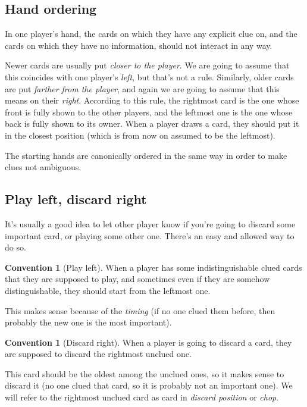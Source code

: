 \documentclass[a4paper]{article}
\theoremstyle{plain}
\theoremstyle{definition}
\newtheorem{convention}[theorem]{Convention}
\begin{document}
\subsection{Hand ordering}

In one player's hand, the cards on which they have any explicit clue on, and the cards on which they have no information, should not interact in any way.

Newer cards are usually put \textit{closer to the player}. We are going to assume that this coincides with one player's \textit{left}, but that's not a rule. Similarly, older cards are put \textit{farther from the player}, and again we are going to assume that this means on their \textit{right}. According to this rule, the rightmost card is the one whose front is fully shown to the other players, and the leftmost one is the one whose back is fully shown to its owner. When a player draws a card, they should put it in the closest position (which is from now on assumed to be the leftmost).

The starting hands are canonically ordered in the same way in order to make clues not ambiguous.

\subsection{Play left, discard right}

It's usually a good idea to let other player know if you're going to discard some important card, or playing some other one. There's an easy and allowed way to do so.

\begin{convention}[Play left]
	\label{play-left}
	When a player has some indistinguishable clued cards that they are supposed to play, and sometimes even if they are somehow distinguishable, they should start from the leftmost one.
\end{convention}

This makes sense because of the \textit{timing} (if no one clued them before, then probably the new one is the most important).

\begin{convention}[Discard right]
	\label{discard-right}
	When a player is going to discard a card, they are supposed to discard the rightmost unclued one.
\end{convention}

This card should be the oldest among the unclued ones, so it makes sense to discard it (no one clued that card, so it is probably not an important one). We will refer to the rightmost unclued card as card in \textit{discard position} or \textit{chop}.
\end{document}
